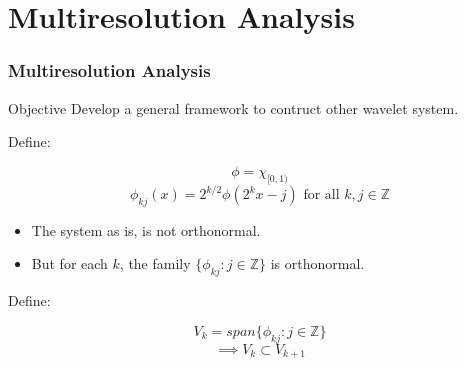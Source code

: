 \documentclass{beamer}
\begin{document}

\section{Multiresolution Analysis} %
\begin{frame}
\frametitle{Multiresolution Analysis}

\begin{block}{Objective}
    Develop a general framework to contruct other  wavelet system.
\end{block}

Define:

\begin{block}{}
    $$\phi = \chi_{[0,1)}$$
    $$\phi_{kj}(x) = 2^{k/2}\phi(2^kx - j) \text{ for all } k, j \in \mathbb{Z}$$
\end{block}

\begin{itemize}
    \item The system as is, is not orthonormal.
    \item But for each $k$, the family $\{ \phi_{kj} : j \in \mathbb{Z} \}$ is orthonormal.
\end{itemize}

Define:

\begin{block}{}
    $$V_k = span\{ \phi_{kj} : j \in \mathbb{Z} \}$$
    $$\implies V_k \subset V_{k+1}$$
\end{block}

\end{frame}
\end{document}
